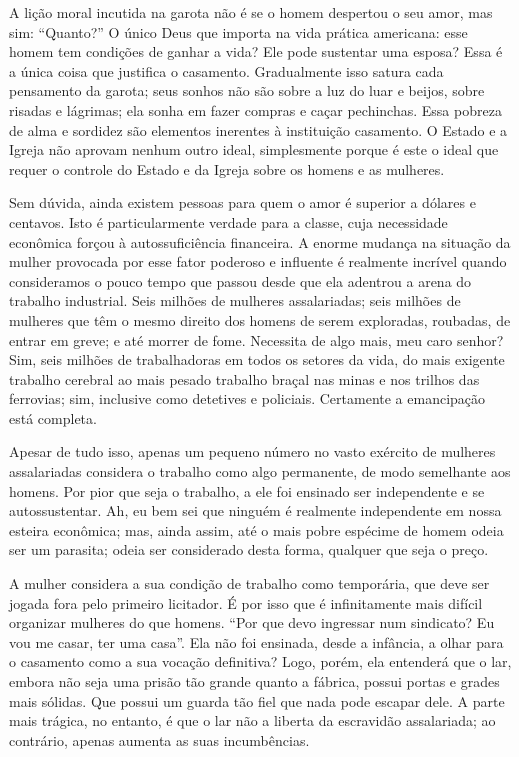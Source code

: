 A lição moral incutida na garota não é se o homem despertou o seu amor,
mas sim: ``Quanto?'' O único Deus que importa na vida prática americana:
esse homem tem condições de ganhar a vida? Ele pode sustentar uma
esposa? Essa é a única coisa que justifica o casamento. Gradualmente
isso satura cada pensamento da garota; seus sonhos não são sobre a luz
do luar e beijos, sobre risadas e lágrimas; ela sonha em fazer compras e
caçar pechinchas. Essa pobreza de alma e sordidez são elementos
inerentes à instituição casamento. O Estado e a Igreja não aprovam
nenhum outro ideal, simplesmente porque é este o ideal que requer o
controle do Estado e da Igreja sobre os homens e as mulheres.

Sem dúvida, ainda existem pessoas para quem o amor é superior a dólares
e centavos. Isto é particularmente verdade para a classe, cuja
necessidade econômica forçou à autossuficiência financeira. A enorme
mudança na situação da mulher provocada por esse fator poderoso e
influente é realmente incrível quando consideramos o pouco tempo que
passou desde que ela adentrou a arena do trabalho industrial. Seis
milhões de mulheres assalariadas; seis milhões de mulheres que têm o
mesmo direito dos homens de serem exploradas, roubadas, de entrar em
greve; e até morrer de fome. Necessita de algo mais, meu caro senhor?
Sim, seis milhões de trabalhadoras em todos os setores da vida, do mais
exigente trabalho cerebral ao mais pesado trabalho braçal nas minas e
nos trilhos das ferrovias; sim, inclusive como detetives e policiais.
Certamente a emancipação está completa.

Apesar de tudo isso, apenas um pequeno número no vasto exército de
mulheres assalariadas considera o trabalho como algo permanente, de modo
semelhante aos homens. Por pior que seja o trabalho, a ele foi ensinado
ser independente e se autossustentar. Ah, eu bem sei que ninguém é
realmente independente em nossa esteira econômica; mas, ainda assim, até
o mais pobre espécime de homem odeia ser um parasita; odeia ser
considerado desta forma, qualquer que seja o preço.

A mulher considera a sua condição de trabalho como temporária, que deve
ser jogada fora pelo primeiro licitador. É por isso que é infinitamente
mais difícil organizar mulheres do que homens. ``Por que devo ingressar
num sindicato? Eu vou me casar, ter uma casa''. Ela não foi ensinada,
desde a infância, a olhar para o casamento como a sua vocação definitiva?
Logo, porém, ela entenderá que o lar, embora não seja uma prisão tão
grande quanto a fábrica, possui portas e grades mais sólidas. Que possui
um guarda tão fiel que nada pode escapar dele. A parte mais trágica, no entanto, é que o lar não a liberta da escravidão assalariada; ao contrário, apenas aumenta as suas incumbências. 

